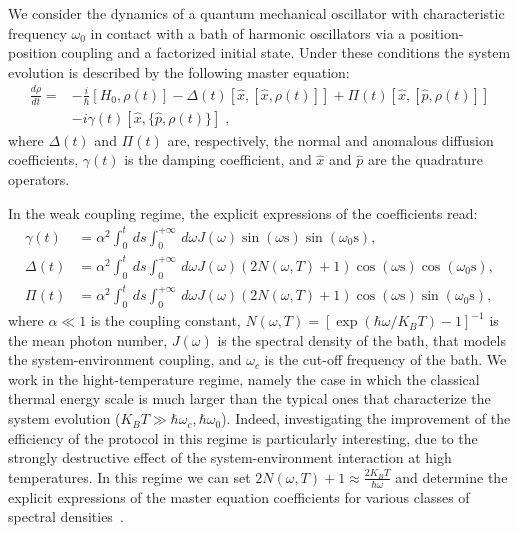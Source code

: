 \documentclass[prl,twocolumn,aps,floatfix,showpacs,tightenlines,superscriptaddress,amsmath,amssymb,amsfonts,10pt]{revtex4-1}
\begin{document}
We consider the dynamics of a quantum mechanical oscillator with characteristic frequency $\omega_0$ in contact with a bath of harmonic oscillators via a position-position coupling and a factorized initial state.
Under these conditions the system evolution is described by the following master equation:
\begin{align}
\label{HPZEq}
\frac{d\rho}{dt} = & -\frac{i}{\hbar} [H_0,\rho(t)]-\Delta(t)[\hat{x},[\hat{x},\rho(t)]]+
\Pi(t)[\hat{x},[\hat{p},\rho(t)]] \nonumber \\ & -i\gamma(t)[\hat{x},\{\hat{p},\rho(t)\}]\;,
\end{align}
where $\Delta(t)$ and $\Pi(t)$ are, respectively, the normal and anomalous diffusion coefficients, $\gamma(t)$ is the damping coefficient,
and $\hat{x}$ and $\hat{p}$ are the quadrature operators.

In the weak coupling regime, the explicit expressions of the coefficients read:
\begin{align}
\gamma(t)&\!=\!\alpha^2\!\int_0^t  \, ds\int_0^{+\infty} \, d\omega J (\omega)  \sin (\text{$\omega $s}) \sin (\text{$\omega_{0} $s}),\label{gamma} \\
\Delta(t)&\!=\!\alpha^2\!\int_0^t  \,\!\! ds\int_0^{+\infty} \, \!\!\!\!\!\!\!\! d\omega J (\omega) (2N(\omega , T)+1) \cos (\text{$\omega $s}) \cos (\text{$\omega_{0} $s}),\label{delta} \\
\Pi(t)&\!=\!\alpha^2\!\int_0^t  \,\!\! ds\int_0^{+\infty} \, \!\!\!\!\!\!\!\! d\omega J (\omega) (2N(\omega , T)+1) \cos (\text{$\omega $s}) \sin (\text{$\omega_{0} $s}),\label{pi}
\end{align}
where $\alpha \ll 1$ is the coupling constant, $N(\omega , T)=[\exp(\hbar \omega/K_B T)-1]^{-1}$ is the mean photon number, $J(\omega)$ is the spectral density of the bath, that models the system-environment coupling, and $\omega_c$ is the cut-off frequency of the bath.
We work in the hight-temperature regime, namely the case in which the classical thermal energy scale is much larger than the typical ones that characterize the system evolution ($K_B T \gg \hbar \omega_c, \hbar \omega_0$). Indeed, investigating the improvement of the efficiency of the protocol in this regime is particularly interesting, due to the strongly destructive effect of the system-environment interaction at high temperatures. In this regime we can set $2N(\omega, T)+1\approx \frac{2K_B T}{\hbar \omega}$ and determine the explicit expressions of the master equation coefficients for various classes of spectral densities~\cite{PhysRevA.80.062324}.
\end{document}
